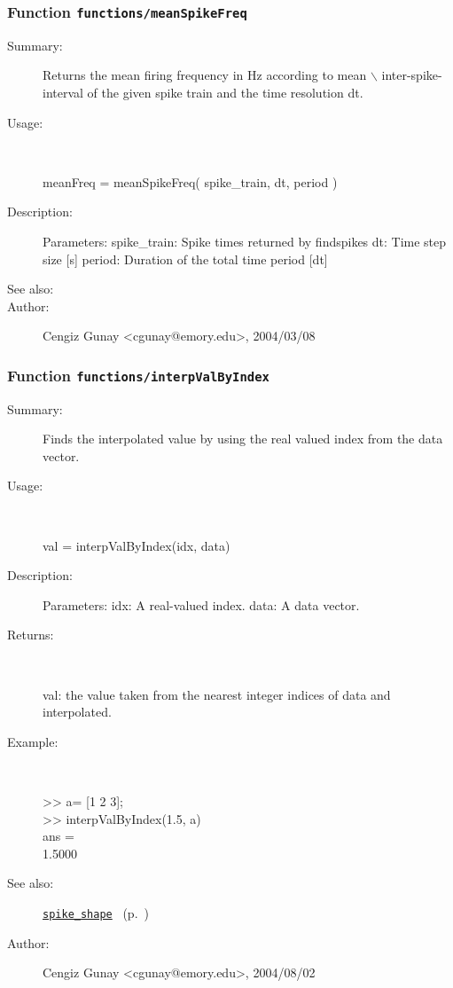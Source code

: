 \subsubsection[Function \texttt{meanSpikeFreq}]{Function \texttt{functions/meanSpikeFreq}}%
%
\label{ref_functions__meanSpikeFreq}%
\hypertarget{ref_functions__meanSpikeFreq}{}%
\begin{description}
\item[Summary:]Returns the mean firing frequency in Hz according to mean $\backslash$
  	    inter-spike-interval of the given spike train and the 
	    time resolution dt.
%
\item[Usage:]~%
\begin{lyxcode}%
meanFreq = meanSpikeFreq( spike\_train, dt, period )
%
\end{lyxcode}%
%
\item[Description:]%
Parameters:
		spike\_train: Spike times returned by findspikes
		dt: Time step size [s]
		period: Duration of the total time period [dt]
%
%
%
\item[See also:]%
%
\item[Author:]%
Cengiz Gunay <cgunay@emory.edu>, 2004/03/08%
\end{description}
\methodline%
\subsubsection[Function \texttt{interpValByIndex}]{Function \texttt{functions/interpValByIndex}}%
%
\label{ref_functions__interpValByIndex}%
\hypertarget{ref_functions__interpValByIndex}{}%
\begin{description}
\item[Summary:]Finds the interpolated value by using the real valued index from the data vector.
%
\item[Usage:]~%
\begin{lyxcode}%
val = interpValByIndex(idx, data)
%
\end{lyxcode}%
%
\item[Description:]%
Parameters:
	idx: A real-valued index.
	data: A data vector.
%
\item[Returns:]~

	val: the value taken from the nearest integer indices of data and interpolated.
%
\item[Example:]~
\begin{lyxcode} >> a= [1 2 3];\\%
 >> interpValByIndex(1.5, a)\\%
 ans =\\%
    1.5000\\%
\end{lyxcode}
%
\item[See also:]%
\hyperlink{ref_spike_shape}{\texttt{spike\_shape}}%
\ (p.~\pageref{ref_spike_shape})%
%
%
\item[Author:]%
Cengiz Gunay <cgunay@emory.edu>, 2004/08/02%
\end{description}
\methodline%
